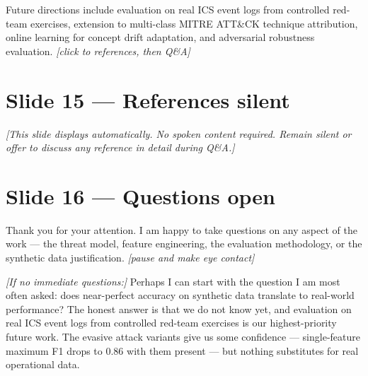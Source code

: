 \documentclass[14pt]{article}
\begin{document}
Future directions include evaluation on real ICS event logs from controlled red-team exercises, extension to multi-class MITRE ATT\&CK technique attribution, online learning for concept drift adaptation, and adversarial robustness evaluation. \textit{[click to references, then Q\&A]}

\section*{Slide 15 — References \hfill \normalfont\small silent}

\textit{[This slide displays automatically. No spoken content required. Remain silent
or offer to discuss any reference in detail during Q\&A.]}

\section*{Slide 16 — Questions \hfill \normalfont\small open}

Thank you for your attention. I am happy to take questions on any aspect of the work --- the threat model, feature engineering, the evaluation methodology, or the synthetic data justification. \textit{[pause and make eye contact]}

\textit{[If no immediate questions:]} Perhaps I can start with the question I am most often asked: does near-perfect accuracy on synthetic data translate to real-world performance? The honest answer is that we do not know yet, and evaluation on real ICS event logs from controlled red-team exercises is our highest-priority future work. The evasive attack variants give us some confidence --- single-feature maximum F1 drops to 0.86 with them present --- but nothing substitutes for real operational data.
\end{document}
